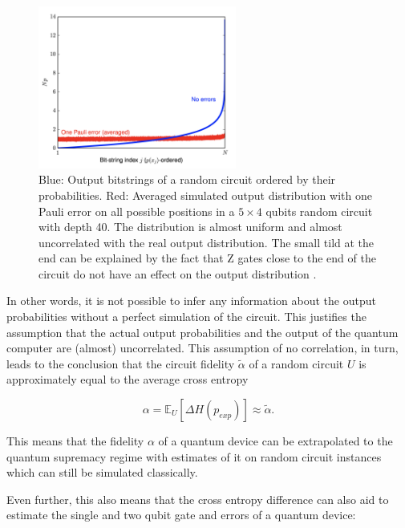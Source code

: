 \begin{figure}[H]
  \centering
  \label{fig:rcs_noise}
  \includegraphics[width=0.58\textwidth]{figures/rcs_noise}
  \caption[Effect of one Pauli error on random circuits]{Blue: Output bitstrings of a random circuit ordered by their probabilities. Red: Averaged 
  simulated output distribution with one Pauli error on all possible positions in a $5 \times 4$ qubits random circuit 
  with depth 40. The distribution is almost uniform and almost uncorrelated with the real output distribution. The small tild at 
  the end can be explained by the fact that Z gates close to the end of the circuit do not have an effect on the output distribution \cite{Boixo2018supremacy}.}
\end{figure}

In other words, it is not possible to infer any information about the output
probabilities without a perfect simulation of the circuit.
This justifies the assumption that the actual output probabilities and the output
of the quantum computer are (almost) uncorrelated.
This assumption of no correlation, in turn, leads to the conclusion that the
circuit fidelity $\tilde{\alpha}$ of a random
circuit $U$ is approximately equal to the average cross entropy

\begin{equation}
  \label{eq:extrapolate}
  \alpha = \mathbb{E}_U[\Delta H(p_{exp})] \approx \tilde{\alpha}.
\end{equation}

This means that the fidelity $\alpha$ of a quantum device can be extrapolated to
the quantum supremacy regime with estimates of it on random circuit instances
which can still be simulated classically.

Even further, this also means that the cross entropy difference can also aid to estimate
the single and two qubit gate and errors of a quantum device:

